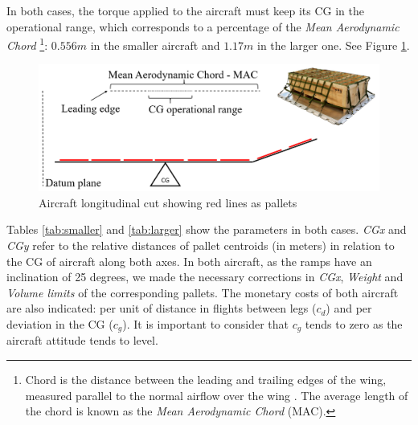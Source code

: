 \documentclass[preprint,authoryear]{elsarticle}
\begin{document}
In both cases, the torque applied to the aircraft must keep its CG in the operational range, which corresponds to a percentage of the {\it Mean Aerodynamic Chord} \footnote{Chord is the distance between the leading and trailing edges of the wing, measured parallel to the normal airflow over the wing \cite[p.18]{HoughtonCarpenter2003}. The average length of the chord is known as the {\it Mean Aerodynamic Chord} (MAC).}: $0.556m$ in the smaller aircraft and $1.17m$ in the larger one. See Figure \ref{fig:lateral}.

\begin{figure}[H]
	\centering
	\includegraphics[scale=0.24]{Images/lateral.png}
	\caption{Aircraft longitudinal cut showing red lines as pallets}
	\label{fig:lateral}
\end{figure}

Tables \ref{tab:smaller} and \ref{tab:larger} show the parameters in both cases. {\it CGx} and {\it CGy} refer to the relative distances of pallet centroids (in meters) in relation to the CG of aircraft along both axes. In both aircraft, as the ramps have an inclination of 25 degrees, we made the necessary corrections in {\it CGx}, {\it Weight} and {\it Volume limits} of the corresponding pallets. The monetary costs of both aircraft are also indicated: per unit of distance in flights between legs ($c_d$) and per deviation in the CG ($c_g$). It is important to consider that $c_g$ tends to zero as the aircraft attitude tends to level.
\end{document}
